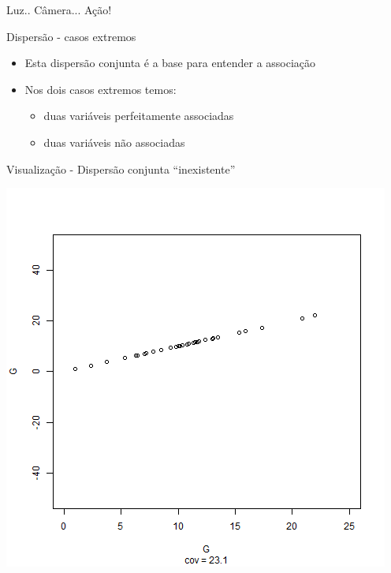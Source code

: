 \documentclass{beamer}
\begin{document}
\begin{frame}{Luz.. Câmera... Ação!}
  \begin{center}
  \end{center}
\end{frame}

\begin{frame}{\small Dispersão - casos extremos}
  \begin{itemize}
    \small
  \item Esta dispersão conjunta é a base para entender a associação
    \bigskip
  \item Nos dois casos extremos temos:
    \begin{itemize}
    \item duas variáveis perfeitamente associadas
    \item duas variáveis não associadas
    \end{itemize}
  \end{itemize}
\end{frame}

\begin{frame}{\small Visualização - Dispersão conjunta ``inexistente''}
  \begin{center}
    \includegraphics[height=.8\textheight]{Cap17/anim-0}
  \end{center}
\end{frame}
\end{document}
